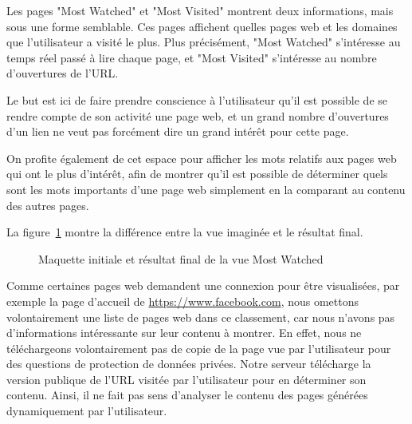 		Les pages "Most Watched" et "Most Visited" montrent deux informations, mais sous une forme semblable. Ces pages affichent quelles pages web et les domaines que l'utilisateur a visité le plus. Plus précisément, "Most Watched" s'intéresse au temps réel passé à lire chaque page, et "Most Visited" s'intéresse au nombre d'ouvertures de l'URL.

		Le but est ici de faire prendre conscience à l'utilisateur qu'il est possible de se rendre compte de son activité une page web, et un grand nombre d'ouvertures d'un lien ne veut pas forcément dire un grand intérêt pour cette page.

		On profite également de cet espace pour afficher les mots relatifs aux pages web qui ont le plus d'intérêt, afin de montrer qu'il est possible de déterminer quels sont les mots importants d'une page web simplement en la comparant au contenu des autres pages.

		La figure~\ref{mostwatched_images} montre la différence entre la vue imaginée et le résultat final.

		\begin{figure}[!h]
			\centering
			\caption{Maquette initiale et résultat final de la vue Most Watched}
			\label{mostwatched_images}
		\end{figure}

		Comme certaines pages web demandent une connexion pour être visualisées, par exemple la page d'accueil de \url{https://www.facebook.com}, nous omettons volontairement une liste de pages web dans ce classement, car nous n'avons pas d'informations intéressante sur leur contenu à montrer. En effet, nous ne téléchargeons volontairement pas de copie de la page vue par l'utilisateur pour des questions de protection de données privées. Notre serveur télécharge la version publique de l'URL visitée par l'utilisateur pour en déterminer son contenu. Ainsi, il ne fait pas sens d'analyser le contenu des pages générées dynamiquement par l'utilisateur.

